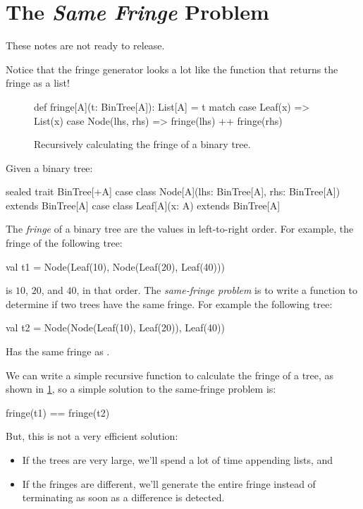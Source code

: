\newlecture

\section{The \emph{Same Fringe} Problem}

\begin{instructor}
These notes are not ready to release.

Notice that the fringe generator looks a lot like the function that returns the fringe as a list!
\end{instructor}


\begin{figure}
\begin{scalacode}
def fringe[A](t: BinTree[A]): List[A] = t match {
  case Leaf(x) => List(x)
  case Node(lhs, rhs) => fringe(lhs) ++ fringe(rhs)
}
\end{scalacode}
\caption{Recursively calculating the fringe of a binary tree.}
\label{fringeRec}
\end{figure}

Given a binary tree:

\begin{scalacode}
sealed trait BinTree[+A]
case class Node[A](lhs: BinTree[A], rhs: BinTree[A]) extends BinTree[A]
case class Leaf[A](x: A) extends BinTree[A]
\end{scalacode}

The \emph{fringe} of a binary tree are the values in left-to-right order. For
example, the fringe of the following tree:
\begin{scalacode}
val t1 = Node(Leaf(10), Node(Leaf(20), Leaf(40)))
\end{scalacode}
is $10$, $20$, and $40$, in that order. The \emph{same-fringe problem} is to write
a function to determine if two trees have the same fringe. For
example the following tree:
%
\begin{scalacode}
val t2 = Node(Node(Leaf(10), Leaf(20)), Leaf(40))
\end{scalacode}
Has the same fringe as .

We can write a simple recursive function to calculate the fringe of a tree,
as shown in \cref{fringeRec}, so a simple solution to the same-fringe problem
is:
\begin{scalacode}
fringe(t1) == fringe(t2)
\end{scalacode}

But, this is not a very efficient solution:
\begin{itemize}

  \item If the trees are very large, we'll spend a lot of time appending
  lists, and

  \item If the fringes are different, we'll generate the entire fringe instead
  of terminating as soon as a difference is detected.

\end{itemize}

